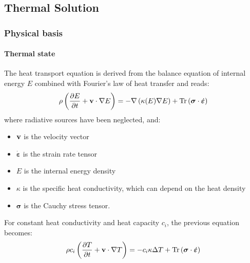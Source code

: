 
\subsection{Thermal Solution} \label{sec:using-issm-capabilities-thermal}
\subsubsection{Physical basis}
\paragraph{Thermal state}
The heat transport equation is derived from the balance equation of internal energy $E$ combined with Fourier's law of heat transfer and reads:
\begin{equation}
	\rho \left(\frac{\partial E}{\partial t} + {\bf v} \cdot \nabla E \right)
	= - \nabla \left(\kappa(E) \nabla E \right) + \mbox{Tr} \left( \boldsymbol{\sigma} \cdot \dot{\boldsymbol{\varepsilon}}\right)
\end{equation}
where radiative sources have been neglected, and:
\begin{itemize}
	\item ${\bf v}$ is the velocity vector
	\item $\dot{\boldsymbol{\varepsilon}}$ is the strain rate tensor
	\item $E$ is the internal energy density
	\item $\kappa$ is the specific heat conductivity, which can depend on the heat density
	\item $\boldsymbol{\sigma}$ is the Cauchy stress tensor.
\end{itemize}

For constant heat conductivity and heat capacity $c_i$, the previous equation becomes:
\begin{equation}
	\rho c_i \left(\frac{\partial T}{\partial t} + {\bf v} \cdot \nabla T \right)
	= - c_i \kappa \Delta T + \mbox{Tr} \left( \boldsymbol{\sigma} \cdot
	\dot{\boldsymbol{\varepsilon}}\right)
\end{equation}

